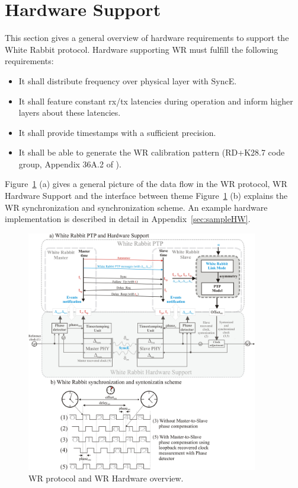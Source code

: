 \documentclass[a4paper, 12pt]{article}
\begin{document}
\newpage

\section{Hardware Support}
\label{sec:hw}


This section gives a general overview of hardware requirements to support the White Rabbit protocol. 
Hardware supporting WR must fulfill the following requirements:
\begin{itemize}
  \item It shall distribute frequency over physical layer with SyncE.
  \item It shall feature constant rx/tx latencies during operation and inform higher layers 
	about these latencies.
  \item It shall provide timestamps with a sufficient precision. 
  \item It shall be able to generate the WR calibration pattern 
	(RD+K28.7 code group, Appendix 36A.2 of \cite{IEEE802.3}).
\end{itemize}

Figure~\ref{fig:clocksHwSpec} (a) gives a general picture of the data flow in the WR 
protocol, WR Hardware Support and the interface between theme
Figure~\ref{fig:clocksHwSpec} (b) explains the WR synchronization and synchronization scheme.
An example hardware implementation is described in detail in Appendix~\ref{sec:sampleHW}.

\begin{figure}[ht!]
  \centering
  \includegraphics[width=0.9\textwidth]{protocol/clocksHwSpec.pdf}
  \caption{WR protocol and WR Hardware overview.}
  \label{fig:clocksHwSpec}
\end{figure}
\end{document}
